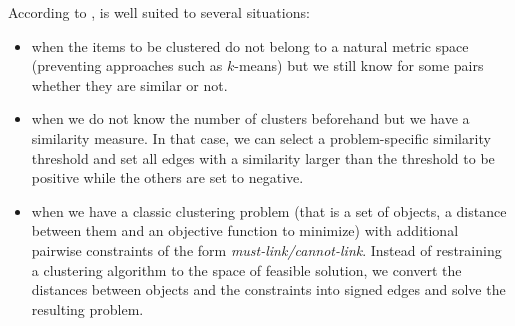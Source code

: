 According to \textcite[Section 5]{Demaine2006}, \pcc{} is well suited to several situations:
\begin{itemize}
   \item when the items to be clustered do not belong to a natural metric space (preventing
      approaches such as $k$-means) but we still know for some pairs whether they are similar or
      not.
   \item when we do not know the number of clusters beforehand but we have a similarity measure. In
      that case, we can select a problem-specific similarity threshold and set all edges with a
      similarity larger than the threshold to be positive while the others are set to negative.
   \item when we have a classic clustering problem (that is a set of objects, a distance between
      them and an objective function to minimize) with additional pairwise constraints of the form
      \emph{must-link/cannot-link}. Instead of restraining a clustering algorithm to the space of
      feasible solution, we convert the distances between objects and the constraints into signed
      edges and solve the resulting \pcc{} problem. 
\end{itemize}

